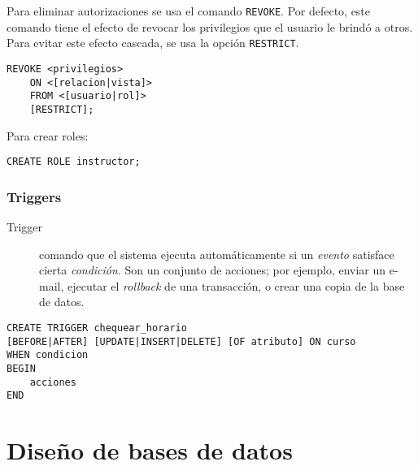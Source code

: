 \documentclass[a4paper, twoside]{article}
\begin{document}
Para eliminar autorizaciones se usa el comando \texttt{REVOKE}. Por
defecto, este comando tiene el efecto de revocar los privilegios que
el usuario le brindó a otros. Para evitar este efecto cascada, se
usa la opción \texttt{RESTRICT}.

\begin{lstlisting}
REVOKE <privilegios>
	ON <[relacion|vista]>
	FROM <[usuario|rol]>
	[RESTRICT];
\end{lstlisting}


Para crear roles:

\begin{lstlisting}
CREATE ROLE instructor;
\end{lstlisting}



\section{Triggers}
\begin{description}
\item [{Trigger}] comando que el sistema ejecuta automáticamente si un
\emph{evento} satisface cierta \emph{condición}. Son un conjunto de
acciones; por ejemplo, enviar un e-mail, ejecutar el \emph{rollback}
de una transacción, o crear una copia de la base de datos.
\end{description}
\begin{lstlisting}
CREATE TRIGGER chequear_horario
[BEFORE|AFTER] [UPDATE|INSERT|DELETE] [OF atributo] ON curso
WHEN condicion
BEGIN
	acciones
END
\end{lstlisting}
\pagebreak{}


\part{Diseño de bases de datos}
\end{document}
